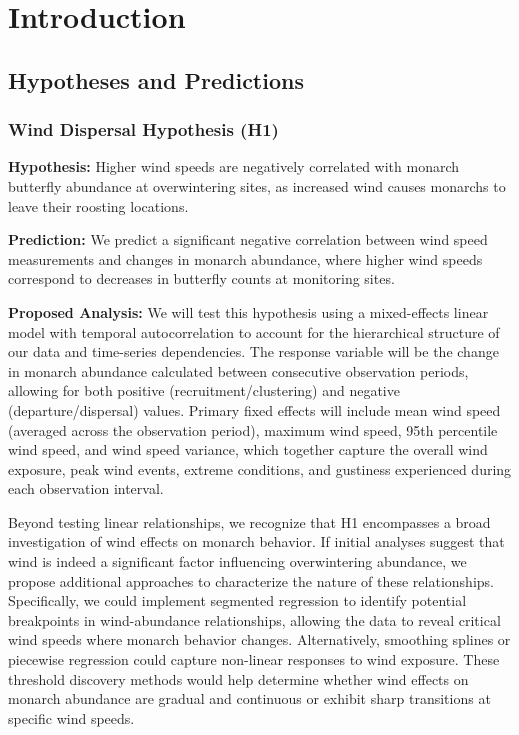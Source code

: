 \chapter{Introduction}
\label{ch:introduction}

\section{Hypotheses and Predictions}

\subsection{Wind Dispersal Hypothesis (H1)}

\textbf{Hypothesis:} Higher wind speeds are negatively correlated with monarch butterfly abundance at overwintering sites, as increased wind causes monarchs to leave their roosting locations.

\textbf{Prediction:} We predict a significant negative correlation between wind speed measurements and changes in monarch abundance, where higher wind speeds correspond to decreases in butterfly counts at monitoring sites.

\textbf{Proposed Analysis:}
We will test this hypothesis using a mixed-effects linear model with temporal autocorrelation to account for the hierarchical structure of our data and time-series dependencies. The response variable will be the change in monarch abundance calculated between consecutive observation periods, allowing for both positive (recruitment/clustering) and negative (departure/dispersal) values. Primary fixed effects will include mean wind speed (averaged across the observation period), maximum wind speed, 95th percentile wind speed, and wind speed variance, which together capture the overall wind exposure, peak wind events, extreme conditions, and gustiness experienced during each observation interval.

Beyond testing linear relationships, we recognize that H1 encompasses a broad investigation of wind effects on monarch behavior. If initial analyses suggest that wind is indeed a significant factor influencing overwintering abundance, we propose additional approaches to characterize the nature of these relationships. Specifically, we could implement segmented regression to identify potential breakpoints in wind-abundance relationships, allowing the data to reveal critical wind speeds where monarch behavior changes. Alternatively, smoothing splines or piecewise regression could capture non-linear responses to wind exposure. These threshold discovery methods would help determine whether wind effects on monarch abundance are gradual and continuous or exhibit sharp transitions at specific wind speeds.

